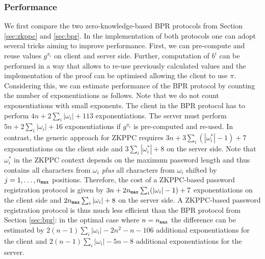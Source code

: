 \subsubsection{Performance}
We first compare the two zero-knowledge-based \ac{BPR} protocols from Section \ref{sec:zkppc} and \ref{sec:bpr}.
In the implementation of both protocols one can adopt several tricks aiming to improve performance. 
First, we can pre-compute and reuse values $g^{\pi_i}$ on client and server side.
Further, computation of $b^i$ can be performed in a way that allows to re-use previously calculated values and the implementation of the proof can be optimised allowing the client to use $\pi$.
Considering this, we can estimate performance of the \ac{BPR} protocol by counting the number of exponentiations as follows.
Note that we do not count exponentiations with small exponents.
%
The client in the \ac{BPR} protocol has to perform $4n+2\sum_i |\omega_i| + 113$ exponentiations.
The server must perform $5n + 2\sum_i |\omega_i| + 16$ exponentiations if $g^{\pi_i}$ is pre-computed and re-used.
In contrast, the generic approach for \ac{ZKPPC} requires $3n+3\sum_i (|\omega^\ast_i|-1)+7$ exponentiations on the client side and $3\sum_i |\omega^\ast_i|+8$ on the server side.
Note that $\omega^\ast_i$ in the \ac{ZKPPC} context depends on the maximum password length and thus contains all characters from $\omega_i$ \emph{plus} all characters from $\omega_i$ shifted by $j = 1,\ldots, {n_\mathtt{max}}$ positions.
Therefore, the cost of a \ac{ZKPPC}-based password registration protocol is given by $3n+2{n_\mathtt{max}}\sum_i (|\omega_i|-1)+7$ exponentiations on the client side and $2{n_\mathtt{max}}\sum_i |\omega_i|+8$ on the server side. 
A \ac{ZKPPC}-based password registration protocol is thus much less efficient than the \ac{BPR} protocol from Section \ref{sec:bpr}: in the optimal case where $n={n_\mathtt{max}}$ the difference can be estimated by  $2(n-1)\sum_i|\omega_i| - 2n^2 - n - 106$ additional exponentiations for the client and $2(n-1)\sum_i|\omega_i| - 5n - 8$ additional exponentiations for the server.

